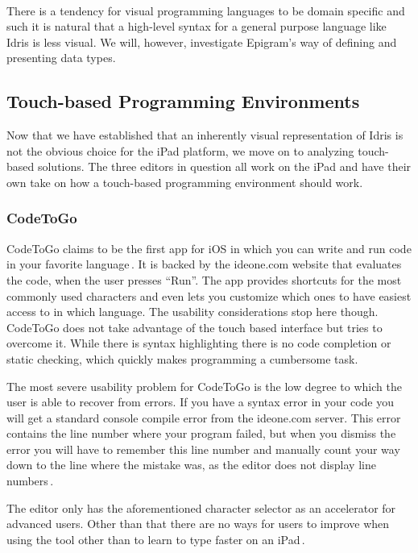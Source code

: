 \paragraph{}

There is a tendency for visual programming languages to be domain specific and such it is natural that a high-level syntax for a general purpose language like Idris is less visual. We will, however, investigate Epigram's way of defining and presenting data types.

\subsection{Touch-based Programming Environments}
Now that we have established that an inherently visual representation of Idris is not the obvious choice for the iPad platform, we move on to analyzing touch-based solutions. The three editors in question all work on the iPad and have their own take on how a touch-based programming environment should work.

\subsubsection{CodeToGo}
CodeToGo claims to be the first app for iOS in which you can write and run code in your favorite language\,\cite{codetogo}. It is backed by the ideone.com website\cite{ideone} that evaluates the code, when the user presses ``Run''. The app provides shortcuts for the most commonly used characters and even lets you customize which ones to have easiest access to in which language. The usability considerations stop here though. CodeToGo does not take advantage of the touch based interface but tries to overcome it. While there is syntax highlighting there is no code completion or static checking, which quickly makes programming a cumbersome task.

The most severe usability problem for CodeToGo is the low degree to which the user is able to recover from errors. If you have a syntax error in your code you will get a standard console compile error from the ideone.com server. This error contains the line number where your program failed, but when you dismiss the error you will have to remember this line number and manually count your way down to the line where the mistake was, as the editor does not display line numbers\,\cite{nielsen1990heuristic}.

The editor only has the aforementioned character selector as an accelerator for advanced users. Other than that there are no ways for users to improve when using the tool other than to learn to type faster on an iPad\,\cite{nielsen1990heuristic}.

